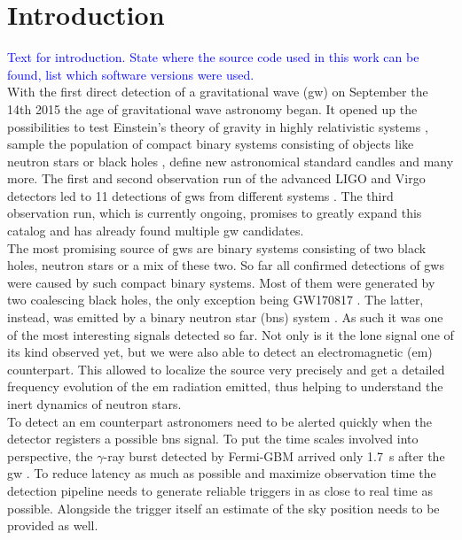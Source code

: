 \section{Introduction}
\textcolor{Blue}{Text for introduction. State where the source code used in this work can be found, list which software versions were used.}\\
With the first direct detection of a gravitational wave (\gls{gw}) on September the 14th 2015 \cite{gw150914} the age of gravitational wave astronomy began. It opened up the possibilities to test Einstein's theory of gravity in highly relativistic systems \cite{test_gr_gw150914}, sample the population of compact binary systems consisting of objects like neutron stars or black holes \cite{population_binary_systems}, define new astronomical standard candles \cite{standard_candles} and many more. The first and second observation run of the advanced LIGO and Virgo detectors \cite{aligo, avirgo} led to 11 detections of \gls{gw}s from different systems \cite{catalog}. The third observation run, which is currently ongoing, promises to greatly expand this catalog and has already found multiple \gls{gw} candidates.\\
The most promising source of \gls{gw}s are binary systems consisting of two black holes, neutron stars or a mix of these two. So far all confirmed detections of \gls{gw}s were caused by such compact binary systems. Most of them were generated by two coalescing black holes, the only exception being GW170817 \cite{catalog}. The latter, instead, was emitted by a binary neutron star (\gls{bns}) system \cite{gw170817}. As such it was one of the most interesting signals detected so far. Not only is it the lone signal one of its kind observed yet, but we were also able to detect an electromagnetic (\gls{em}) counterpart. This allowed to localize the source very precisely and get a detailed frequency evolution of the \gls{em} radiation emitted, thus helping to understand the inert dynamics of neutron stars.\\
To detect an \gls{em} counterpart astronomers need to be alerted quickly when the detector registers a possible \gls{bns} signal. To put the time scales involved into perspective, the $\gamma$-ray burst detected by Fermi-GBM arrived only \SI{1.7}{\s} after the \gls{gw} \cite{gw170817}. To reduce latency as much as possible and maximize observation time the detection pipeline needs to generate reliable triggers in as close to real time as possible. Alongside the trigger itself an estimate of the sky position needs to be provided as well.\\
